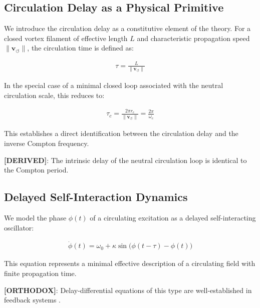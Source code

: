 \documentclass[11pt]{article}
\theoremstyle{definition}
\theoremstyle{plain}
\theoremstyle{remark}
\newcommand{\rc}{{r_c}}
\newcommand{\vnorm}{\lVert \mathbf{v}_{\!\boldsymbol{\circlearrowleft}} \rVert}
\begin{document}
    \subsection{Circulation Delay as a Physical Primitive}
        
        We introduce the circulation delay as a constitutive element of the theory.
        For a closed vortex filament of effective length $L$ and characteristic propagation speed $\vnorm$, the circulation time is defined as:
        
        \begin{align}
            \tau = \frac{L}{\vnorm}
            \label{eq:delay_time}
        \end{align}
        
        In the special case of a minimal closed loop associated with the neutral circulation scale, this reduces to:
        
        \begin{align}
            \tau_c = \frac{2\pi \rc}{\vnorm} = \frac{2\pi}{\omega_c}
            \label{eq:compton_delay}
        \end{align}
        
        This establishes a direct identification between the circulation delay and the inverse Compton frequency.
        
        \textbf{[DERIVED]}: The intrinsic delay of the neutral circulation loop is identical to the Compton period.
    
    \subsection{Delayed Self-Interaction Dynamics}
        
        We model the phase $\phi(t)$ of a circulating excitation as a delayed self-interacting oscillator:
        
        \begin{align}
            \dot{\phi}(t) = \omega_0 + \kappa \sin\big(\phi(t - \tau) - \phi(t)\big)
            \label{eq:delay_phase}
        \end{align}
        
        This equation represents a minimal effective description of a circulating field with finite propagation time.
        
        \textbf{[ORTHODOX]}: Delay-differential equations of this type are well-established in feedback systems \cite{SST_delay_basic}.
    
\end{document}
